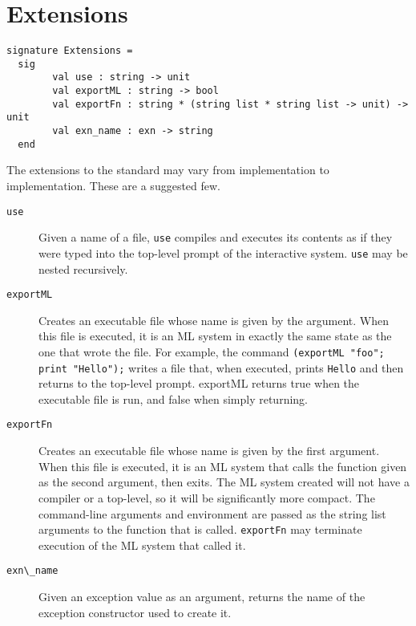 \section{Extensions}
\begin{verbatim}
signature Extensions =
  sig
        val use : string -> unit
        val exportML : string -> bool
        val exportFn : string * (string list * string list -> unit) -> unit
        val exn_name : exn -> string
  end
\end{verbatim}
The extensions to the standard may vary from implementation to
implementation.  These are a suggested few.
\begin{description}
\item[\verb"use"]  Given a name of a file, \verb"use" compiles
and executes its contents as if they were typed into the top-level
prompt of the interactive system.  \verb"use" may be nested
recursively.

\item[\verb"exportML"]  Creates an executable file whose name is
given by the argument.  When this file is executed, it is an ML
system in exactly the same state as the one that wrote the file.  For
example, the command
\verb|(exportML "foo"; print "Hello");| writes a file that, when
executed, prints \verb"Hello" and then returns to the top-level
prompt.  exportML returns true when the executable file is run,
and false when simply returning.

\item[\verb"exportFn"]  Creates an executable file whose name is given
by the first argument.  When this file is executed, it is an ML
system that calls the function given as the second argument, then
exits.  The ML system created will not have a compiler or a
top-level, so it will be significantly more compact.
The command-line arguments and environment
are passed as the string list arguments to the
function that is called.   \verb"exportFn" may terminate
execution of the ML system that called it.

\item[\verb"exn\_name"]   Given an exception value as an argument,
returns the name of the exception constructor used to create it.
\end{description}
